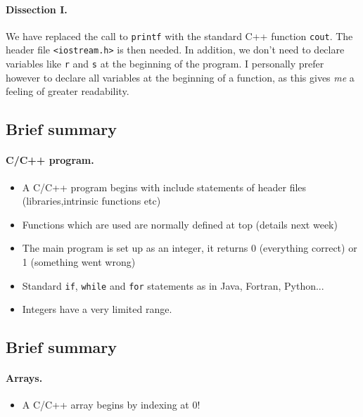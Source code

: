\documentclass[%
oneside,                 %
final,                   %
10pt]{article}
\begin{document}
{%
\paragraph{Dissection I.}
We have replaced the call to \Verb!printf! with the standard C++ function
\Verb!cout!. The header file \Verb!<iostream.h>! is then needed.
In addition, we don't need to
declare variables like \Verb!r! and \Verb!s!  at the beginning of the program.
I personally prefer
however to declare all variables at the beginning of a function, as this
gives \emph{me} a feeling of greater readability.



\subsection{Brief summary}


\paragraph{C/C++ program.}
\begin{itemize}
  \item A C/C++ program begins with include statements of header files (libraries,intrinsic functions etc)

  \item Functions which are used are normally defined at top (details next week)

  \item The main program is set up as an integer, it returns 0 (everything correct) or 1 (something went wrong)

  \item Standard \Verb!if!, \Verb!while! and \Verb!for! statements as in Java, Fortran, Python...

  \item Integers have a very limited range.
\end{itemize}

\noindent



\subsection{Brief summary}


\paragraph{Arrays.}
\begin{itemize}
  \item A C/C++ array begins by indexing at 0!


\end{itemize}}
\end{document}
